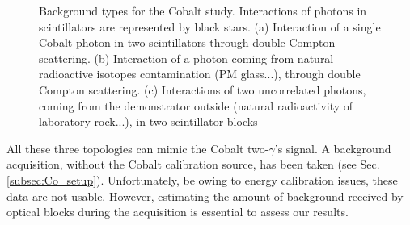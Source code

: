 \begin{figure}[h]
\begin{subfigure}[t]{0.30\textwidth}
    \captionsetup{justification=justified}
    \caption{
      \label{subfig:Co_bkg_3}}
  \end{subfigure}
  \caption{Background types for the Cobalt study.
    Interactions of photons in scintillators are represented by black stars.
    (a) Interaction of a single Cobalt photon in two scintillators through double Compton scattering.
    (b) Interaction of a photon coming from natural radioactive isotopes contamination (PM glass...), through double Compton scattering.
    (c) Interactions of two uncorrelated photons, coming from the demonstrator outside (natural radioactivity of laboratory rock...), in two scintillator blocks
    \label{fig:Co_bkg}}
\end{figure}
All these three topologies can mimic the Cobalt two-$\gamma$'s signal.
A background acquisition, without the Cobalt calibration source, has been taken (see Sec.\ref{subsec:Co_setup}).
Unfortunately, be owing to energy calibration issues, these data are not usable.
However, estimating the amount of background received by optical blocks during the acquisition is essential to assess our results.

